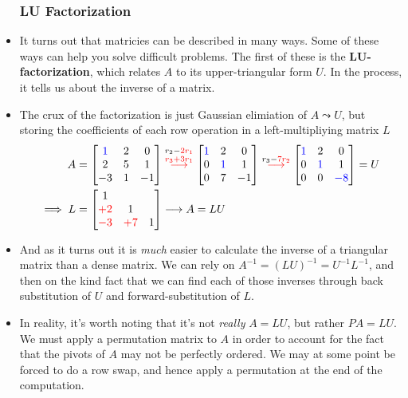 \documentclass[11pt]{article}
\begin{document}
\begin{itemize}
	\subsubsection*{LU Factorization}
\item It turns out that matricies can be described in many ways. Some of these ways can help you solve difficult problems. The first of these is the $\bm{LU}$\textbf{-factorization}, which relates $A$ to its upper-triangular form $U$. In the process, it tells us about the inverse of a matrix. 
\item The crux of the factorization is just Gaussian elimiation of $A \leadsto U$, but storing the coefficients of each row operation in a left-multipliying matrix $L$ 
\begin{align}
	A &= \begin{bmatrix} \color{blue}{1} & 2 & 0 \\ 2 & 5 & 1 \\ -3 & 1 & -1 \end{bmatrix} \stackrel{r_2 - \color{red}{2}r_1}{\stackrel{r_3 + {\color{red}{3}}r_1}{\longrightarrow}}
    \begin{bmatrix} \color{blue}{1} & 2 & 0 \\ 0 & \color{blue}{1} & 1 \\  0 & 7 & -1 \end{bmatrix} \stackrel{r_3 - \color{red}{7}r_2}{\longrightarrow}
    \begin{bmatrix} \color{blue}{1} & 2 & 0 \\ 0 & \color{blue}{1} & 1 \\  0 & 0 & \color{blue}{-8} \end{bmatrix} = U  \\
	\implies L &= \begin{bmatrix} 1 & & \\ \color{red}{+2} & 1 & \\ \color{red}{-3} & \color{red}{+7} & 1 \end{bmatrix}
	\longrightarrow A = LU
\end{align} 
\item And as it turns out it is \textit{much} easier to calculate the inverse of a triangular matrix than a dense matrix. We can rely on $A^{-1} = (LU)^{-1} = U^{-1}L^{-1}$, and then on the kind fact that we can find each of those inverses through back substitution of $U$ and forward-substitution of $L$.
\item In reality, it's worth noting that it's not \textit{really} $A=LU$, but rather $PA=LU$. We must apply a permutation matrix to $A$ in order to account for the fact that the pivots of $A$ may not be perfectly ordered. We may at some point be forced to do a row swap, and hence apply a permutation at the end of the computation.


\end{itemize}
\end{document}
